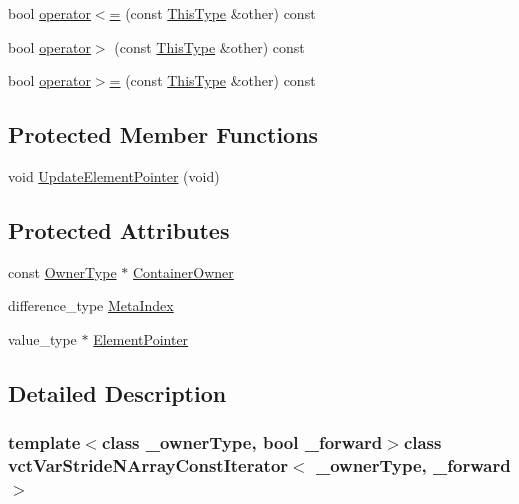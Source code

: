 \begin{DoxyCompactItemize}
\item 
bool \hyperlink{classvct_var_stride_n_array_const_iterator_a21773b18a4bdc93dbd56a07d41dd4b68}{operator$<$=} (const \hyperlink{classvct_var_stride_n_array_const_iterator_ac729d2af265785aad6fdd43a70fbffdb}{This\+Type} \&other) const 
\item 
bool \hyperlink{classvct_var_stride_n_array_const_iterator_aa67cb3208852e5d2519a69eb3c54b2ec}{operator$>$} (const \hyperlink{classvct_var_stride_n_array_const_iterator_ac729d2af265785aad6fdd43a70fbffdb}{This\+Type} \&other) const 
\item 
bool \hyperlink{classvct_var_stride_n_array_const_iterator_aacf54ef7d20d17635ad80cd4f636e0f2}{operator$>$=} (const \hyperlink{classvct_var_stride_n_array_const_iterator_ac729d2af265785aad6fdd43a70fbffdb}{This\+Type} \&other) const 
\end{DoxyCompactItemize}
\subsection*{Protected Member Functions}
\begin{DoxyCompactItemize}
\item 
void \hyperlink{classvct_var_stride_n_array_const_iterator_aa578e91dddecd98da9eedbfb2a75b3e0}{Update\+Element\+Pointer} (void)
\end{DoxyCompactItemize}
\subsection*{Protected Attributes}
\begin{DoxyCompactItemize}
\item 
const \hyperlink{classvct_var_stride_n_array_const_iterator_ac75d53a8defeee467ba9ebe2962e29ac}{Owner\+Type} $\ast$ \hyperlink{classvct_var_stride_n_array_const_iterator_a86106a192cd073058a176e51564e86d0}{Container\+Owner}
\item 
difference\+\_\+type \hyperlink{classvct_var_stride_n_array_const_iterator_a6f62ef67435fdd9f972f2f29cd0a011b}{Meta\+Index}
\item 
value\+\_\+type $\ast$ \hyperlink{classvct_var_stride_n_array_const_iterator_ac19e4e3a7c753b4893fd939d5d4077b1}{Element\+Pointer}
\end{DoxyCompactItemize}


\subsection{Detailed Description}
\subsubsection*{template$<$class \+\_\+owner\+Type, bool \+\_\+forward$>$class vct\+Var\+Stride\+N\+Array\+Const\+Iterator$<$ \+\_\+owner\+Type, \+\_\+forward $>$}


